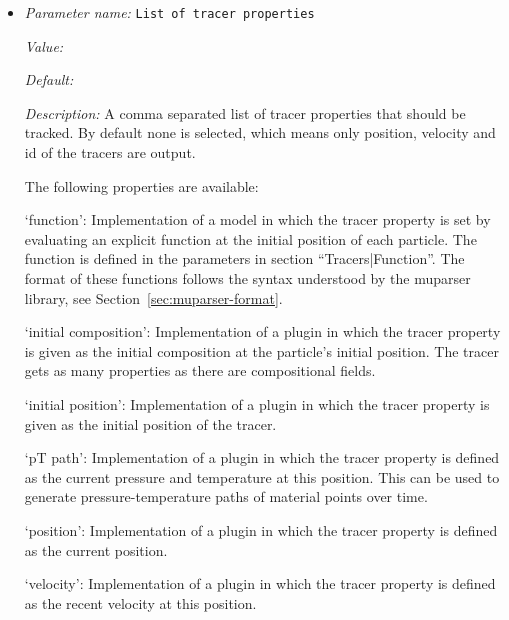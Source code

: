 \begin{itemize}
{\it Default:} first particle


{\it Description:} Select one of the following models:

`first particle': Return the properties of the first tracer in the given cell.


{\it Possible values:} [Selection first particle ]
\item {\it Parameter name:} {\tt List of tracer properties}
\label{parameters:Postprocess/Tracers/List of tracer properties}


{\it Value:} 


{\it Default:} 


{\it Description:} A comma separated list of tracer properties that should be tracked. By default none is selected, which means only position, velocity and id of the tracers are output. 

The following properties are available:

`function': Implementation of a model in which the tracer property is set by evaluating an explicit function at the initial position of each particle. The function is defined in the parameters in section ``Tracers|Function''. The format of these functions follows the syntax understood by the muparser library, see Section~\ref{sec:muparser-format}.



`initial composition': Implementation of a plugin in which the tracer property is given as the initial composition at the particle's initial position. The tracer gets as many properties as there are compositional fields.



`initial position': Implementation of a plugin in which the tracer property is given as the initial position of the tracer.



`pT path': Implementation of a plugin in which the tracer property is defined as the current pressure and temperature at this position. This can be used to generate pressure-temperature paths of material points over time.



`position': Implementation of a plugin in which the tracer property is defined as the current position. 



`velocity': Implementation of a plugin in which the tracer property is defined as the recent velocity at this position.





\end{itemize}
